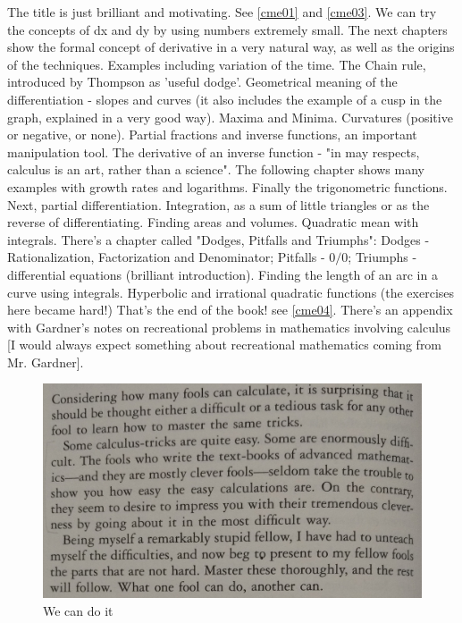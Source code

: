\documentclass{cornell}
\begin{document}
%
{The title is just brilliant and motivating. See \ref{cme01} and \ref{cme03}. We can try the concepts of dx and dy by using numbers extremely small. The next chapters show the formal concept of derivative in a very natural way, as well as the origins of the techniques. Examples including variation of the time. The Chain rule, introduced by Thompson as 'useful dodge'. Geometrical meaning of the differentiation - slopes and curves (it also includes the example of a cusp in the graph, explained in a very good way). Maxima and Minima. Curvatures (positive or negative, or none). Partial fractions and inverse functions, an important manipulation tool. The derivative of an inverse function - "in may respects, calculus is an art, rather than a science". The following chapter shows many examples with growth rates and logarithms. Finally the trigonometric functions. Next, partial differentiation. Integration, as a sum of little triangles or as the reverse of differentiating. Finding areas and volumes. Quadratic mean with integrals. There's a chapter called "Dodges, Pitfalls and Triumphs": Dodges - Rationalization, Factorization and Denominator; Pitfalls - \( 0/0 \); Triumphs - differential equations (brilliant introduction). Finding the length of an arc in a curve using integrals. Hyperbolic and irrational quadratic functions (the exercises here became hard!) That's the end of the book! see \ref{cme04}. There's an appendix with Gardner's notes on recreational problems in mathematics involving calculus [I would always expect something about recreational mathematics coming from Mr. Gardner]. }%

\begin{figure}[!t]
\centering
\includegraphics[width=1.0\linewidth]{images/cme02.jpg}
\caption{We can do it }
\label{cme02}
\end{figure}
\end{document}
